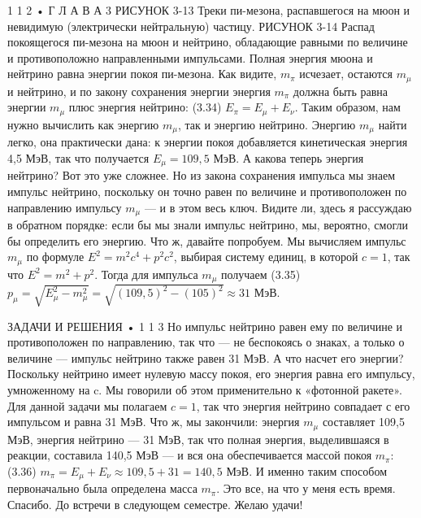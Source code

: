 \documentclass[10pt,oneside]{article}
\begin{document}
1 1 2 • Г Л А В А  3 РИСУНОК 3-13 Треки пи-мезона, распавшегося на мюон и невидимую (электрически нейтральную) частицу. РИСУНОК 3-14 Распад покоящегося пи-мезона на мюон и нейтрино, обладающие равными по величине и противоположно направленными импульсами. Полная энергия мюона и нейтрино равна энергии покоя пи-мезона. Как видите, \(m_\pi\) исчезает, остаются \(m_\mu\) и нейтрино, и по закону сохранения энергии энергия \(m_\pi\) должна быть равна энергии \(m_\mu\) плюс энергия нейтрино: (3.34) \(E_\pi = E_\mu + E_\nu\). Таким образом, нам нужно вычислить как энергию \(m_\mu\), так и энергию нейтрино. Энергию \(m_\mu\) найти легко, она практически дана: к энергии покоя добавляется кинетическая энергия 4,5 МэВ, так что получается \(E_\mu = 109,5\) МэВ. А какова теперь энергия нейтрино? Вот это уже сложнее. Но из закона сохранения импульса мы знаем импульс нейтрино, поскольку он точно равен по величине и противоположен по направлению импульсу \(m_\mu\) --- и в этом весь ключ. Видите ли, здесь я рассуждаю в обратном порядке: если бы мы знали импульс нейтрино, мы, вероятно, смогли бы определить его энергию. Что ж, давайте попробуем. Мы вычисляем импульс \(m_\mu\) по формуле \(E^2 = m^2 c^4 + p^2 c^2\), выбирая систему единиц, в которой \(c = 1\), так что \(E^2 = m^2 + p^2\). Тогда для импульса \(m_\mu\) получаем (3.35) \(p_\mu = \sqrt{E_\mu^2 - m_\mu^2} = \sqrt{(109,5)^2 - (105)^2} \approx 31\) МэВ.\par

ЗАДАЧИ И РЕШЕНИЯ • 1 1 3 Но импульс нейтрино равен ему по величине и противоположен по направлению, так что --- не беспокоясь о знаках, а только о величине --- импульс нейтрино также равен 31 МэВ. А что насчет его энергии? Поскольку нейтрино имеет нулевую массу покоя, его энергия равна его импульсу, умноженному на c. Мы говорили об этом применительно к «фотонной ракете». Для данной задачи мы полагаем \(c = 1\), так что энергия нейтрино совпадает с его импульсом и равна 31 МэВ. Что ж, мы закончили: энергия \(m_\mu\) составляет 109,5 МэВ, энергия нейтрино --- 31 МэВ, так что полная энергия, выделившаяся в реакции, составила 140,5 МэВ --- и вся она обеспечивается массой покоя \(m_\pi\): (3.36) \(m_\pi = E_\mu + E_\nu \approx 109,5 + 31 = 140,5\) МэВ. И именно таким способом первоначально была определена масса \(m_\pi\). Это все, на что у меня есть время. Спасибо. До встречи в следующем семестре. Желаю удачи!\par

\clearpage
{}
\end{document}
